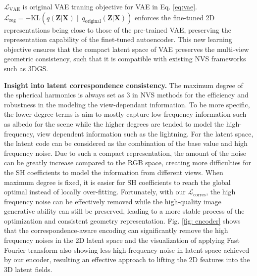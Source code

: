 $\mathcal{L}_\text{VAE}$ is original VAE traning objective for VAE in Eq. \ref{eq:vae}. 
$\mathcal{L}_{\text{reg}} = -\text{KL}\left( q(\boldsymbol{Z}|\boldsymbol{X}) \parallel q_{\text{original}}(\boldsymbol{Z}|\boldsymbol{X}) \right)$ enforces the fine-tuned 2D representations being close to those of the pre-trained VAE, preserving the representation capability of the finet-tuned autoencoder.  This new learning objective ensures that the compact latent space of VAE preserves the multi-view geometric consistency, such that it is compatible with existing NVS frameworks such as 3DGS.



\textbf{Insight into latent correspondence consistency.} 
The maximum degree of the spherical harmonics is always set as 3 in NVS methods for the efficiency and robustness in the modeling the view-dependant information. To be more specific, the lower degree terms is aim to mostly capture low-frequency information such as albedo for the scene while the higher degrees are tended to model the high-frequency, view dependent information such as the lightning. For the latent space, the latent code can be considered as the combination of the base value and high frequency noise. Due to such a compact representation, the amount of the noise can be greatly increase compared to the RGB space, creating more difficulties for the SH coefficients to model the information from different views. When maximum degree is fixed, it is easier for SH coefficients to reach the global optimal instead of locally over-fitting. Fortunately, with our $\mathcal{L}_{\text{corres}}$, the high frequency noise can be effectively removed while the high-quality image generative ability can still be preserved, leading to a more stable process of the optimization and consistent geometry representation. Fig. \ref{fig: encoder} shows that the correspondence-aware encoding can significantly remove the high frequency noises in the 2D latent space and the visualization of applying Fast Fourier transform also showing less high-frequency noise in latent space achieved by our encoder,  resulting an effective approach to lifting the 2D features into the 3D latent fields.

